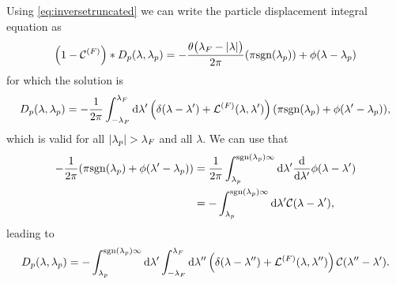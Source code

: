 \documentclass[11pt, a4paper]{report} %
\begin{document}
Using \cref{eq:inversetruncated} we can write the particle displacement integral equation as 
\begin{align}
  \label{eq:33}
  \qty(1 - \mathcal{C}^{(F)}) * D_p\qty(\lambda, \lambda_p) = -\frac{\theta\qty\big(\lambda_F-\abs{\lambda})}{2\pi} \qty(\pi\textrm{sgn}\qty(\lambda_p)) + \phi\qty(\lambda-\lambda_p)
\end{align}
for which the solution is 
\begin{align}
  \label{eq:34}
  D_p\qty(\lambda,\lambda_p) = -\frac{1}{2\pi} \int_{-\lambda_F}^{\lambda_F} \dd \lambda' \left(\delta\qty(\lambda-\lambda') + \mathcal{L}^{(F)}\qty(\lambda,\lambda') \right)\qty(\pi \mathrm{sgn}\qty(\lambda_p) + \phi\qty(\lambda'-\lambda_p)),
\end{align}
which is valid for all \(\abs{\lambda_p}>\lambda_F\) and all \(\lambda\).
We can use that
\begin{align}
  \label{eq:35}
  -\frac{1}{2\pi}\qty(\pi \mathrm{sgn}\qty(\lambda_p) + \phi\qty(\lambda'-\lambda_p)) &= \frac{1}{2\pi} \int_{\lambda_p}^{\mathrm{sgn}\qty(\lambda_p)\infty} \dd \lambda' \frac{\dd}{\dd\lambda'} \phi\qty(\lambda-\lambda') \\
                                                                          &= - \int_{\lambda_p}^{\mathrm{sgn}\qty(\lambda_p)\infty}\dd \lambda' \mathcal{C}\qty(\lambda-\lambda'),
\end{align}
leading to~\cite{Caux2015}
\begin{align}
  \label{eq:particledisplacement}
  	D_p\qty(\lambda, \lambda_p) = - \int_{\lambda_p}^{\textrm{sgn}\qty(\lambda_p)\infty} \dd \lambda' \int_{-\lambda_F}^{\lambda_F} \dd  \lambda'' \left(\delta\qty(\lambda-\lambda'') + \mathcal{L}^{(F)}\qty(\lambda,\lambda'') \right)\mathcal{C}\qty(\lambda''-\lambda').
\end{align}
\end{document}
